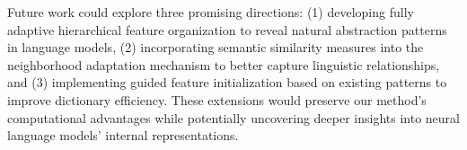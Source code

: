 \documentclass{article} %
\begin{document}
Future work could explore three promising directions: (1) developing fully adaptive hierarchical feature organization to reveal natural abstraction patterns in language models, (2) incorporating semantic similarity measures into the neighborhood adaptation mechanism to better capture linguistic relationships, and (3) implementing guided feature initialization based on existing patterns to improve dictionary efficiency. These extensions would preserve our method's computational advantages while potentially uncovering deeper insights into neural language models' internal representations.



\end{document}
